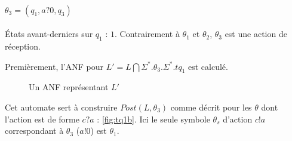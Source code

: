 \paragraph{$\theta_3=(q_1,a?0,q_3)$}

États avant-derniers sur $q_1$ : ${1}$. Contrairement à $\theta_1$ et $\theta_2$, $\theta_3$ est une action de réception.

Premièrement, l'ANF pour $L'=L\bigcap \Sigma^*.\theta_3.\Sigma^*.tq_1$ est calculé.

\begin{figure}[H]
    \centering
    \caption{Un ANF représentant $L'$}\label{fig:tq1}
\end{figure}

Cet automate sert à construire $Post(L,\theta_3)$ comme décrit pour les $\theta$ dont l'action est de forme $c?a$ : \ref{fig:tq1b}. Ici le seule symbole $\theta_s$ d'action $c!a$ correspondant à $\theta_3$ ($a!0$) est $\theta_1$.


